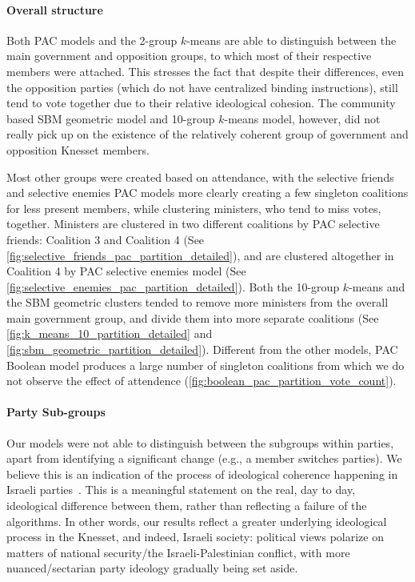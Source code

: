 \paragraph{Overall structure}
Both PAC models and the 2-group $k$-means are able to distinguish between the
main government and opposition groups, to which most of their respective
members were attached.
This stresses the fact that despite their differences, even the opposition
parties (which do not have centralized binding instructions), still tend to
vote together due to their relative ideological cohesion.
The community based SBM geometric model and 10-group $k$-means model, however,
did not really pick up on the existence of the relatively coherent group of
government and opposition Knesset members.

Most other groups were created based on attendance, with the selective friends
and selective enemies PAC models more
clearly creating a few singleton coalitions for less present members, while
clustering ministers, who tend to miss votes, together.
Ministers are clustered in two different coalitions by PAC selective friends:
Coalition 3 and Coalition 4
(See \autoref{fig:selective_friends_pac_partition_detailed}), and are clustered
altogether in Coalition 4 by PAC selective enemies model (See
\autoref{fig:selective_enemies_pac_partition_detailed}).
Both the 10-group $k$-means and the SBM geometric clusters tended to remove
more ministers from the overall main government group, and divide them into
more separate coalitions (See \autoref{fig:k_means_10_partition_detailed} and
\autoref{fig:sbm_geometric_partition_detailed}).
Different from the other models, PAC Boolean model produces a large number of
singleton coalitions from which we do not observe the effect of attendence
(\autoref{fig:boolean_pac_partition_vote_count}).

\paragraph{Party Sub-groups}
 Our models were not able to distinguish between the subgroups within parties,
 apart from identifying a significant change (e.g., a member switches parties).
 We believe this is an indication of the process of ideological coherence
 happening in Israeli parties~\cite{Kal19}.
 This is a meaningful statement on the real, day to day, ideological difference
 between them, rather than reflecting a failure of the algorithms.
 In other words, our results reflect a greater underlying ideological process
 in the Knesset, and indeed, Israeli society: political views polarize on
 matters of national security/the Israeli-Palestinian conflict, with more 
 nuanced/sectarian party ideology gradually being set aside.
